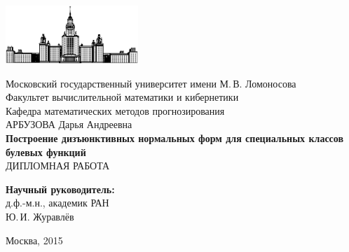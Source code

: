 \documentclass[12pt,a4paper,oneside,fleqn,leqno]{article}
\theoremstyle{definition}
\begin{document}
\begin{titlepage}
\begin{center}
    \includegraphics[width=50mm]{msu.eps}

    \bigskip
	Московский государственный университет имени М.\,В. Ломоносова\\
	Факультет вычислительной математики и кибернетики\\
	Кафедра математических методов прогнозирования\\[20mm]

    {\Large
        АРБУЗОВА Дарья Андреевна\\[10mm]
\Large 
        \textbf{Построение дизъюнктивных нормальных форм для специальных классов булевых функций}\\[30mm]
        \normalsize
        ДИПЛОМНАЯ РАБОТА
    }

    \vfill

\begin{flushright}
  \textbf{Научный руководитель:}\\
  д.ф.-м.н., академик РАН\\
  Ю.\,И. Журавлёв
\end{flushright}

\vfill

\begin{center}
Москва, 2015
\end{center}

\end{center}
\end{titlepage}


\newpage
\setcounter{page}{2}
\renewcommand{\contentsname}{Содержание}
\tableofcontents


\newpage
\end{document}

